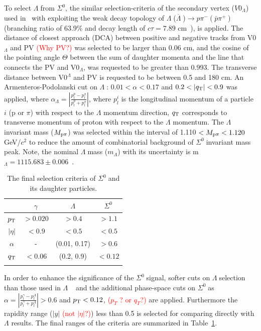 \documentclass[ALICE,manyauthors]{cernphprep}
\newcommand{\sig}{\ensuremath{\Sigma^0  \; }}
\newcommand{\lam}{\ensuremath{\Lambda \; }}
\newcommand{\alam}{\ensuremath{\overline{\Lambda} \; }}
\newcommand{\red}{\textcolor{red}}
\begin{document}
To select \lam from $\Sigma^0$, the similar selection-criteria of the secondary vertex ($V0_{\Lambda}$) used 
in~\cite{cite:DDChin-Lam,cite:lambda_pp,cite:Lam-PLB14} with exploiting the weak decay topology
of \lam(\alam)$ \to p \pi^{-} (\bar{p} \pi^{+})$ (branching ratio of 63.9\% and decay length of
$c\tau = 7.89$ cm~\cite{cite:PDG}), is applied. The distance of closest approach (DCA) between 
positive and negative tracks from V0$_\Lambda$ and PV \red{(Why PV?)} was selected to be larger 
than 0.06 cm, and the cosine of the pointing angle $\Theta$ between the sum of daughter momenta and 
the line that connects the PV and V0$_\Lambda$, was requested to be greater than 0.993. The transverse 
distance between V0$^\Lambda$ and PV is requested to be between 0.5 and 180 cm. An 
Armenteros-Podolanski cut on \lam: $0.01 < \alpha < 0.17$ and $0.2 < |q_{\rm{T}}| < 0.9 $ 
was applied, where $\alpha_{\Lambda}  = |\frac{ p_l^{p} - p_l^{\pi}}{ p_l^{p} + p_l^{\pi} }  |$, where $p_l^i$ 
is the longitudinal momentum of a particle $i$ (p or $\pi$) 
with respect to the $\Lambda$ momentum direction, $q_{\rm{T}}$ corresponds to transverse momentum 
of proton with respect to the $\Lambda$ momentum. The $\Lambda$ invariant mass ($M_{\rm{p}\pi}$) was selected 
within the interval of 1.110 $< M_{\rm{p}\pi}  < 1.120$ GeV/$c^2$ to reduce the amount of combinatorial 
background of \sig invariant mass peak. Note, the nominal \lam mass ($m_\Lambda$) with its uncertainty is m$_\Lambda=1115.683 \pm 0.006$~\cite{cite:PDG}.

\begin{table}[h!]
\centering
\begin{tabular}{c| cc| c}
 & $\gamma$ & $\Lambda$ & $\Sigma^0$ \\
\hline\noalign{\smallskip}
$p_{\rm{T}}$ & $> 0.020$ & $>0.4$ & $> 1.1$ \\
$|\eta|$ & $< 0.9$ & $< 0.5$ & $< 0.5$ \\
$\alpha$ & - & (0.01, 0.17) & $>0.6$ \\
$q_{\rm{T}}$ & $< 0.06$ & (0.2, 0.9) & $< 0.12$ \\
\hline\noalign{\smallskip}
\end{tabular}
\caption{The final selection criteria of \sig and its daughter particles.}
\label{tab:selection}    
\end{table} 

In order to enhance the significance of the \sig signal, softer cuts on \lam selection than those used in 
\lam~\cite{cite:lambda_pp,cite:Lam-PLB14} and the additional phase-space cuts on \sig as
$\alpha  = |\frac{ p_l^{\gamma} - p_l^{\Lambda} }{ p_l^{\gamma} + p_l^{\Lambda} } |>0.6$ and $p_{\rm{T}} < 0.12$,
\red{($p_T$ ? or $q_T$?)} are applied. Furthermore the rapidity range ($|y|$ \red{(not $|\eta|$?)}) less 
than 0.5 is selected for comparing directly with $\Lambda$ results. The final ranges of the criteria are summarized 
in Table~\ref{tab:selection}.
\end{document}
